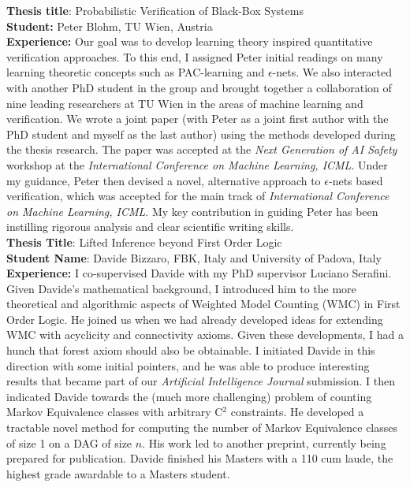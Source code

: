 \documentclass[10pt, a4paper]{article}
\newcommand{\years}[1]{\marginnote{\scriptsize #1}}
\begin{document}
 
 \years{2024W-2025S} \textbf{Thesis title}: Probabilistic Verification of Black-Box Systems \\
 \textbf{Student:} Peter Blohm,  TU Wien, Austria\\
 \textbf{Experience:} Our goal was to develop learning theory inspired quantitative verification approaches. 
 To this end, I assigned Peter initial readings on many learning theoretic concepts such as PAC-learning and $\epsilon$-nets. 
 We also interacted with another PhD student in the group and brought together a collaboration of nine leading researchers at TU Wien in the areas of machine learning and verification. 
 We wrote a joint paper (with Peter as a joint first author with the PhD student and myself as the last author) using the methods developed during the thesis research.
 The paper was accepted at the \emph{Next Generation of AI Safety} workshop at the \emph{International Conference on Machine Learning, ICML}. 
 Under my guidance, Peter then devised a novel, alternative approach to $\epsilon$-nets based verification, which was accepted for the main track of \emph{International Conference on Machine Learning, ICML}. 
 My key contribution in guiding Peter has been instilling rigorous analysis and clear scientific writing skills.\\ 

 \years{2022W-2023S}\textbf{Thesis Title}:  Lifted Inference beyond First Order Logic\\
 \textbf{Student Name}: Davide Bizzaro, FBK, Italy and University of Padova, Italy\\
 \textbf{Experience:} I co-supervised Davide with my PhD supervisor Luciano Serafini. Given Davide's mathematical background, I introduced him to the more theoretical and algorithmic aspects of Weighted Model Counting (WMC) in First Order Logic. He joined us when we had already developed ideas for extending WMC with acyclicity and connectivity axioms.  Given these developments, I had a hunch that forest axiom should also be obtainable. I initiated Davide in this direction with some initial pointers, and he was able to produce interesting results that became part of our \emph{Artificial Intelligence Journal} submission. I then indicated Davide towards the (much more challenging) problem of counting Markov Equivalence classes with arbitrary C$^2$ constraints. He developed a tractable novel method for computing the number of Markov Equivalence classes of size 1 on a DAG of size $n$. His work led to another preprint, currently being prepared for publication.
Davide finished his Masters with a 110 cum laude, the highest grade awardable to a Masters student.
 \vspace*{-1em}
\end{document}
